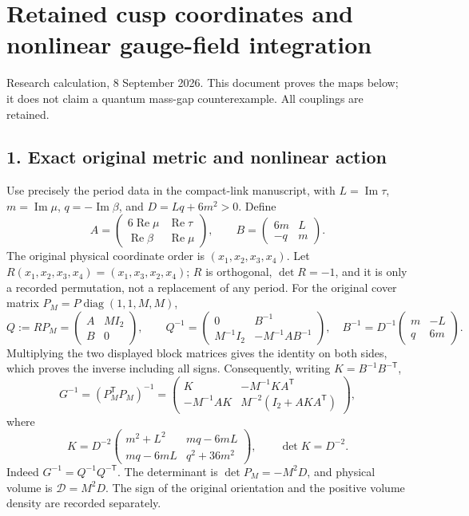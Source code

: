 \documentclass[
  11pt,
]{article}
\author{}
\date{}
\begin{document}
\section{Retained cusp coordinates and nonlinear gauge-field
integration}\label{retained-cusp-coordinates-and-nonlinear-gauge-field-integration}

Research calculation, 8 September 2026. This document proves the maps
below; it does not claim a quantum mass-gap counterexample. All
couplings are retained.

\subsection{1. Exact original metric and nonlinear
action}\label{exact-original-metric-and-nonlinear-action}

Use precisely the period data in the compact-link manuscript, with
\(L=\operatorname{Im}\tau\), \(m=\operatorname{Im}\mu\),
\(q=-\operatorname{Im}\beta\), and \(D=Lq+6m^2>0\). Define \[
A=\begin{pmatrix}6\operatorname{Re}\mu&\operatorname{Re}\tau\\
\operatorname{Re}\beta&\operatorname{Re}\mu\end{pmatrix},\qquad
B=\begin{pmatrix}6m&L\\-q&m\end{pmatrix}.
\] The original physical coordinate order is \((x_1,x_2,x_3,x_4)\). Let
\(R(x_1,x_2,x_3,x_4)=(x_1,x_3,x_2,x_4)\); \(R\) is orthogonal,
\(\det R=-1\), and it is only a recorded permutation, not a replacement
of any period. For the original cover matrix
\(P_M=P\operatorname{diag}(1,1,M,M)\), \[
 Q:=RP_M=\begin{pmatrix}A&MI_2\\B&0\end{pmatrix},\qquad
 Q^{-1}=\begin{pmatrix}0&B^{-1}\\M^{-1}I_2&-M^{-1}AB^{-1}\end{pmatrix},
\quad B^{-1}=D^{-1}\begin{pmatrix}m&-L\\q&6m\end{pmatrix}.
\] Multiplying the two displayed block matrices gives the identity on
both sides, which proves the inverse including all signs. Consequently,
writing \(K=B^{-1}B^{-\mathsf T}\), \[
G^{-1}=(P_M^{\mathsf T}P_M)^{-1}
=\begin{pmatrix}
K&-M^{-1}KA^{\mathsf T}\\
-M^{-1}AK&M^{-2}(I_2+AKA^{\mathsf T})
\end{pmatrix},
\] where \[
K=D^{-2}\begin{pmatrix}
m^2+L^2&mq-6mL\\mq-6mL&q^2+36m^2
\end{pmatrix},\qquad \det K=D^{-2}.
\] Indeed \(G^{-1}=Q^{-1}Q^{-\mathsf T}\). The determinant is
\(\det P_M=-M^2D\), and physical volume is \(\mathcal D=M^2D\). The sign
of the original orientation and the positive volume density are recorded
separately.
\end{document}
